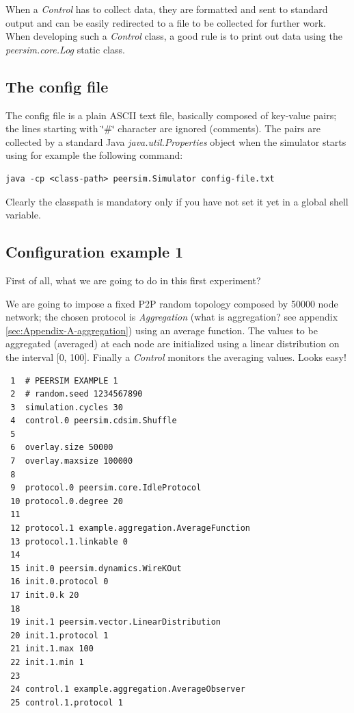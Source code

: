 \documentclass[a4paper,11pt]{article}
\begin{document}

When a \emph{Control} has to collect data, they are formatted and sent to
standard output and can be easily redirected to a file to be collected
for further work. When developing such a \emph{Control} class, a good
rule is to print out data using the \emph{peersim.core.Log} static class.


\subsection{The config file}
\label{configfile}

The config file is a plain ASCII text file, basically composed of
key-value pairs; the lines starting with \char`\"{}\#\char`\"{} character
are ignored (comments). The pairs are collected by a standard Java
\emph{java.util.Properties} object when the simulator starts using
for example the following command:

\begin{verbatim}
java -cp <class-path> peersim.Simulator config-file.txt
\end{verbatim}


Clearly the classpath is mandatory only if you have not set it yet
in a global shell variable.

\subsection{Configuration example 1}

First of all, what we are going to do in this first experiment? 

We are going to impose a fixed P2P random topology composed by 50000
node network; the chosen protocol is \emph{Aggregation} (what is
aggregation? see appendix \ref{sec:Appendix-A-aggregation}) using
an average function. The values to be aggregated (averaged) at each
node are initialized using a linear distribution on the interval {[}0,
100{]}. Finally a \emph{Control} monitors the averaging values.
Looks easy!

\footnotesize
\begin{verbatim}
 1  # PEERSIM EXAMPLE 1
 2  # random.seed 1234567890
 3  simulation.cycles 30
 4  control.0 peersim.cdsim.Shuffle
 5
 6  overlay.size 50000
 7  overlay.maxsize 100000
 8 
 9  protocol.0 peersim.core.IdleProtocol
 10 protocol.0.degree 20
 11
 12 protocol.1 example.aggregation.AverageFunction
 13 protocol.1.linkable 0
 14
 15 init.0 peersim.dynamics.WireKOut
 16 init.0.protocol 0
 17 init.0.k 20
 18
 19 init.1 peersim.vector.LinearDistribution
 20 init.1.protocol 1
 21 init.1.max 100
 22 init.1.min 1
 23
 24 control.1 example.aggregation.AverageObserver
 25 control.1.protocol 1
\end{verbatim}
\normalsize
\end{document}
